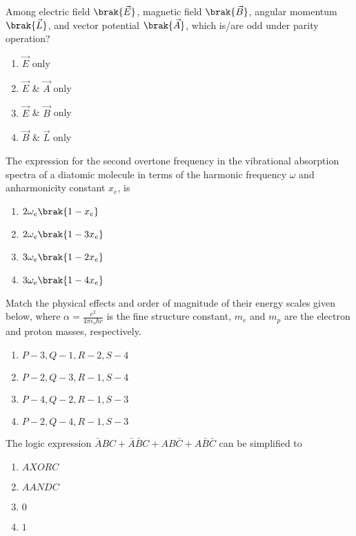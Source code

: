 \item Among electric field $\brak{\vec{E}}$, magnetic field $\brak{\vec{B}}$, angular momentum $\brak{\vec{L}}$, and vector potential $\brak{\vec{A}}$, which is/are odd under parity  operation?
\begin{enumerate}
    \item $\vec{E}$ only
    \item $\vec{E}$ \& $\vec{A}$ only
    \item $\vec{E}$ \& $\vec{B}$ only
    \item $\vec{B}$ \& $\vec{L}$ only
\end{enumerate}

\item The expression for the second overtone frequency in the vibrational absorption spectra of a diatomic molecule in terms of the harmonic frequency $\omega$ and anharmonicity constant $x_e$, is
\begin{enumerate}
    \item $2 \omega_e \brak{1 - x_e}$
    \item $2 \omega_e \brak{1 - 3x_e}$
    \item $3 \omega_e \brak{1 - 2x_e}$
    \item $3 \omega_e \brak{1 - 4x_e}$
\end{enumerate}

\item Match the physical effects and order of magnitude of their energy scales given below, where $\alpha=\frac{e^2}{4\pi\epsilon_o\hbar c}$ is the fine structure constant, $m_e$ and $m_p$ are the electron and proton masses, respectively.


\begin{enumerate}
    \item $P-3, Q-1, R-2, S-4$
    \item $P-2, Q-3, R-1, S-4$
    \item $P-4, Q-2, R-1, S-3$
    \item $P-2, Q-4, R-1, S-3$
\end{enumerate}

\item The logic expression $\bar{A}BC + \bar{A}\bar{B}C + AB\bar{C} + A\bar{B}\bar{C}$ can be simplified to
\begin{enumerate}
    \item $A XOR C$
    \item $A AND C$
    \item $0$
    \item $1$
\end{enumerate}

